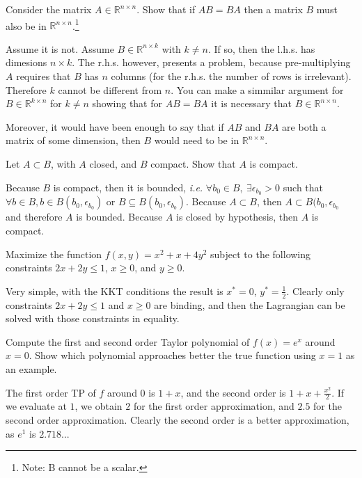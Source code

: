 \documentclass[a4paper,answers]{exam}
\begin{document}
{
\sffamily
\begin{questions}

\question Consider the matrix $A\in\mathds{R}^{n\times n}$. Show that if $AB=BA$ then a matrix $B$ must also be in $\mathds{R}^{n\times n}$.\footnote{Note: B cannot be a scalar.}

\begin{solution}
	Assume it is not. Assume $B\in\mathds{R}^{n\times k}$ with $k\neq n$. If so, then the l.h.s. has dimesions $n\times k$. The r.h.s. however, presents a problem, because pre-multiplying $A$ requires that $B$ has $n$ columns (for the r.h.s. the number of rows is irrelevant). Therefore $k$ cannot be different from $n$. You can make a simmilar argument for $B\in\mathds{R}^{k\times n}$ for $k\neq n$ showing that for $AB=BA$ it is necessary that $B\in\mathds{R}^ {n\times n}$.

Moreover, it would have been enough to say that if $AB$ and $BA$ are both a matrix of some dimension, then $B$ would need to be in $\mathds{R}^{n\times n}$.
\end{solution}
 
\question Let $A\subset B$, with $A$ closed, and $B$ compact. Show that $A$ is compact.

\begin{solution}
	Because $B$ is compact, then it is bounded, \textit{i.e.} $\forall b_0\in B,\ \exists \epsilon_{b_0}>0$ such that $\forall b \in B, b\in B(b_0,\epsilon_{b_0})$ or $B\subseteq B(b_0,\epsilon_{b_0})$. Because $A\subset B$, then $A\subset B(b_0,\epsilon_{b_0}$ and therefore $A$ is bounded. Because $A$ is closed by hypothesis, then $A$ is compact.
\end{solution}

\question Maximize the function $f(x,y) = x^2+x+4y^2$ subject to the following constraints $2x+2y \leq 1$, $x\geq 0$, and $y\geq 0$.

\begin{solution}
	Very simple, with the KKT conditions the result is $x^*=0$, $y^*=\frac{1}{2}$. Clearly only constraints $2x+2y\leq 1$ and $x\geq 0$ are binding, and then the Lagrangian can be solved with those constraints in equality.
\end{solution}

\question Compute the first and second order Taylor polynomial of $f(x)=e^x$ around $x=0$. Show which polynomial approaches better the true function using $x=1$ as an example.

\begin{solution}
 	The first order TP of $f$ around 0 is $1+x$, and the second order is $1+x+\frac{x^2}{2}$. If we evaluate at $1$, we obtain $2$ for the first order approximation, and $2.5$ for the second order approximation. Clearly the second order is a better approximation, as $e^1$ is $2.718...$
\end{solution}


\end{questions}}
\end{document}
